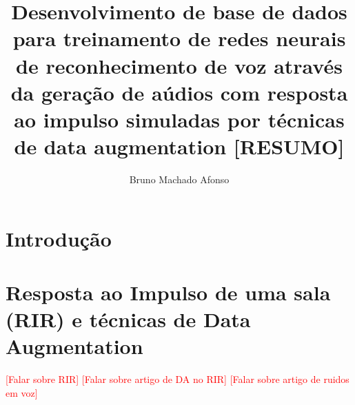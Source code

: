 \documentclass{article}
\title{Desenvolvimento de base de dados para treinamento de redes neurais de reconhecimento de voz
através da geração de aúdios com resposta ao impulso simuladas por técnicas de data augmentation [RESUMO]}
\author{Bruno Machado Afonso}
\begin{document}
\maketitle

\section{Introdução}
\section{Resposta ao Impulso de uma sala (RIR) e técnicas de Data Augmentation}
\textcolor{red}{\LARGE{[Falar sobre RIR]}} \newline
\textcolor{red}{\LARGE{[Falar sobre artigo de DA no RIR]}} \newline
\textcolor{red}{\LARGE{[Falar sobre artigo de ruidos em voz]}} \newline


\cite{RIR_Data_Aug}
\cite{Speech_Rec}

 

\end{document}
